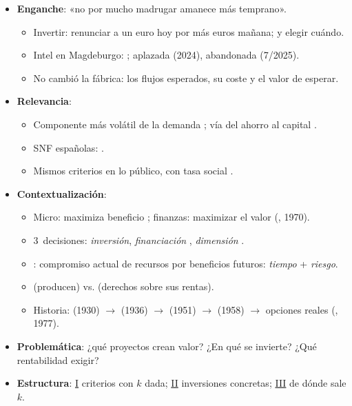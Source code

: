 \documentclass{article}
\begin{document}
\cabecerarepaso
\begin{columnas}

\begin{itemize}
\item \textbf{Enganche}: «no por mucho madrugar amanece más temprano».
  \begin{itemize}
  \item Invertir: renunciar a un euro hoy por más euros mañana; y elegir cuándo.
  \item Intel en Magdeburgo: ; aplazada (2024), abandonada (7/2025).
  \item No cambió la fábrica: los flujos esperados, su coste y el valor de esperar.
  \end{itemize}
\item \textbf{Relevancia}:
  \begin{itemize}
  \item Componente más volátil de la demanda ; vía del ahorro al capital .
  \item SNF españolas: .
  \item Mismos criterios en lo público, con tasa social .
  \end{itemize}
\item \textbf{Contextualización}:
  \begin{itemize}
  \item Micro: maximiza beneficio ; finanzas: maximizar el valor (, 1970).
  \item 3~decisiones: \emph{inversión}, \emph{financiación} , \emph{dimensión} .
  \item {}: compromiso actual de recursos por beneficios futuros: \emph{tiempo} + \emph{riesgo}.
  \item {} (producen) vs.  (derechos sobre sus rentas).
  \item Historia:  (1930) $\to$  (1936) $\to$  (1951) $\to$  (1958) $\to$ opciones reales (, 1977).
  \end{itemize}
\item \textbf{Problemática}: ¿qué proyectos crean valor? ¿En qué se invierte? ¿Qué rentabilidad exigir?
\item \textbf{Estructura}: \hyperref[rep:I]{I} criterios con $k$ dada; \hyperref[rep:II]{II} inversiones concretas; \hyperref[rep:III]{III} de dónde sale $k$.

\end{itemize}
\end{columnas}
\end{document}

